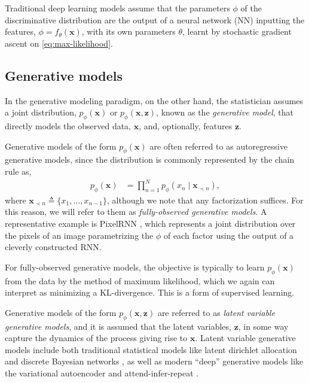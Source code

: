 Traditional deep learning models \citep{GoodfellowEtAl2016} assume that the parameters $\phi$ of the discriminative distribution are the output of a neural network (NN) inputting the features, $\phi=f_\theta(\mathbf{x})$, with its own parameters $\theta$, learnt by stochastic gradient ascent on \eqref{eq:max-likelihood}.

\subsection{Generative models}
In the generative modeling paradigm, on the other hand, the statistician assumes a joint distribution, $p_\phi(\mathbf{x})$ or $p_\phi(\mathbf{x},\mathbf{z})$, known as the \emph{generative model}, that directly models the observed data, $\mathbf{x}$, and, optionally, features $\mathbf{z}$.

Generative models of the form $p_\phi(\mathbf{x})$ are often referred to as autoregressive generative models, since the distribution is commonly represented by the chain rule as,
\begin{align*}
	p_\phi(\mathbf{x}) &= \prod^N_{n=1}p_\phi(x_n\mid\mathbf{x}_{\prec n}),
\end{align*}
where $\mathbf{x}_{\prec n}\triangleq\{x_1,\ldots,x_{n-1}\}$, although we note that any factorization suffices. For this reason, we will refer to them as \emph{fully-observed generative models}. A representative example is PixelRNN \citep{VanDenOordEtAl2016a}, which represents a joint distribution over the pixels of an image parametrizing the $\phi$ of each factor using the output of a cleverly constructed RNN. 

For fully-observed generative models, the objective is typically to learn $p_\phi(\mathbf{x})$ from the data by the method of maximum likelihood, which we again can interpret as minimizing a KL-divergence. This is a form of supervised learning.

Generative models of the form $p_\phi(\mathbf{x},\mathbf{z})$ are referred to as \emph{latent variable generative models}, and it is assumed that the latent variables, $\mathbf{z}$, in some way capture the dynamics of the process giving rise to $\mathbf{x}$. Latent variable generative models include both traditional statistical models like latent dirichlet allocation \citep{blei2003latent} and discrete Bayesian networks \citep{KollerFriedman2009}, as well as modern ``deep'' generative models like the variational autoencoder \citep{KingmaWelling2013} and attend-infer-repeat \citep{eslami2016attend}.

